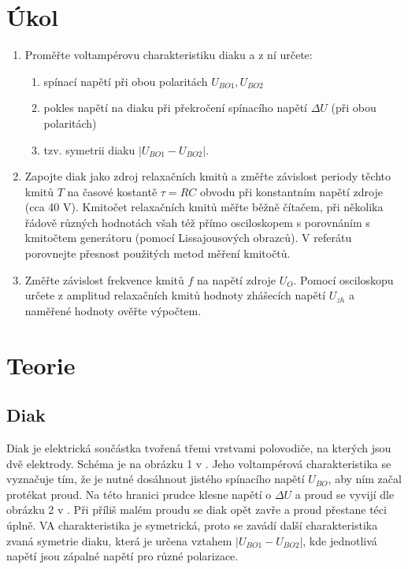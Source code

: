 \documentclass[a4paper,12pt]{article}
\begin{document}
\section{Úkol}
\noindent
\begin{enumerate}
    \item Proměřte voltampérovu charakteristiku diaku a z ní určete:
    \begin{enumerate}
        \item spínací napětí při obou polaritách $U_{BO1},U_{BO2}$
        \item pokles napětí na diaku při překročení spínacího napětí $\Delta U$ (při obou polaritách)
        \item tzv. symetrii diaku $|U_{BO1}-U_{BO2}|$.
    \end{enumerate}
    \item Zapojte diak jako zdroj relaxačních kmitů a změřte závislost periody těchto kmitů $T$ na časové 
    kostantě $\tau = RC$ obvodu při konstantním napětí zdroje (cca 40 V). Kmitočet relaxačních kmitů měřte 
    běžně čítačem, při několika řádově různých hodnotách všah též přímo osciloskopem s porovnáním s kmitočtem 
    generátoru (pomocí Lissajousových obrazců). V referátu porovnejte přesnost použitých metod měření kmitočtů.
    \item Změřte závislost frekvence kmitů $f$ na napětí zdroje $U_O$. Pomocí osciloskopu určete z amplitud 
    relaxačních kmitů hodnoty zhášecích napětí $U_{zh}$ a naměřené hodnoty ověřte výpočtem.
\end{enumerate}

\section{Teorie}

\subsection{Diak}
    Diak je elektrická součástka tvořená třemi vrstvami polovodiče, na kterých jsou dvě elektrody. 
    Schéma je na obrázku 1 v \cite{text}. Jeho voltampérová charakteristika se vyznačuje tím, že 
    je nutné dosáhnout jistého spínacího napětí $U_{BO}$, aby ním začal protékat proud. Na této hranici 
    prudce klesne napětí o $\Delta U$ a proud se vyvijí dle obrázku 2 v \cite{text}. Při příliš malém 
    proudu se diak opět zavře a proud přestane téci úplně. VA charakteristika je symetrická, proto se 
    zavádí další charakteristika zvaná symetrie diaku, která je určena vztahem $|U_{BO1}-U_{BO2}|$, kde 
    jednotlivá napětí jsou zápalné napětí pro různé polarizace.
\end{document}
